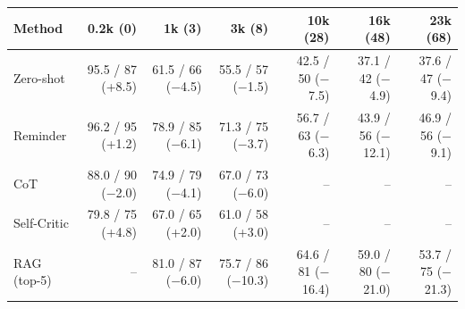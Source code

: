 \begin{tabular}{lrrrrrr}
\toprule
Method & 0.2k (0) & 1k (3) & 3k (8) & 10k (28) & 16k (48) & 23k (68) \\
\midrule
Zero-shot & 95.5 / 87 (+8.5) & 61.5 / 66 ($-$4.5) & 55.5 / 57 ($-$1.5) & 42.5 / 50 ($-$7.5) & 37.1 / 42 ($-$4.9) & 37.6 / 47 ($-$9.4) \\
Reminder & 96.2 / 95 (+1.2) & 78.9 / 85 ($-$6.1) & 71.3 / 75 ($-$3.7) & 56.7 / 63 ($-$6.3) & 43.9 / 56 ($-$12.1) & 46.9 / 56 ($-$9.1) \\
CoT & 88.0 / 90 ($-$2.0) & 74.9 / 79 ($-$4.1) & 67.0 / 73 ($-$6.0) & -- & -- & -- \\
Self-Critic & 79.8 / 75 (+4.8) & 67.0 / 65 (+2.0) & 61.0 / 58 (+3.0) & -- & -- & -- \\
RAG (top-5) & -- & 81.0 / 87 ($-$6.0) & 75.7 / 86 ($-$10.3) & 64.6 / 81 ($-$16.4) & 59.0 / 80 ($-$21.0) & 53.7 / 75 ($-$21.3) \\
\bottomrule
\end{tabular}
